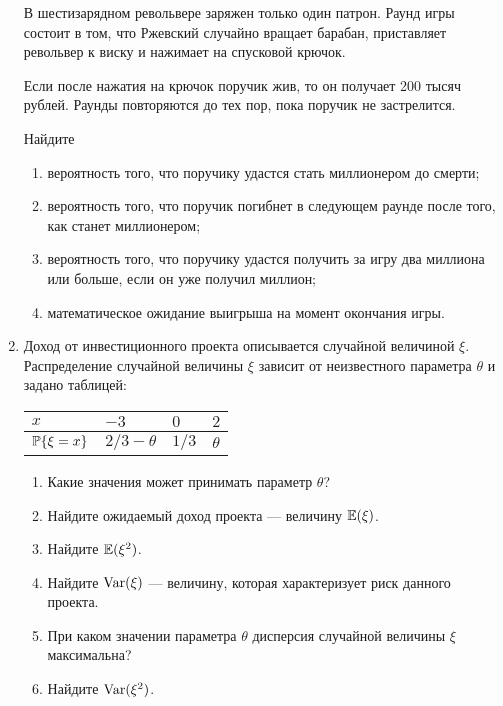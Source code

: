 \begin{enumerate}
  В шестизарядном револьвере заряжен только один патрон. Раунд игры состоит в том, что Ржевский случайно вращает барабан, приставляет револьвер к виску и нажимает на спусковой крючок. 
  
  Если после нажатия на крючок поручик жив, то он получает 200 тысяч рублей. Раунды повторяются до тех пор, пока поручик не застрелится.
  
  Найдите
  
  \begin{enumerate}
      \item вероятность того, что поручику удастся стать миллионером до смерти;
      \item вероятность того, что поручик погибнет в следующем раунде после того, как станет миллионером;
      \item вероятность того, что поручику удастся получить за игру два миллиона или больше, если он уже получил миллион;
      \item математическое ожидание выигрыша на момент окончания игры.
  \end{enumerate}
  
  \item Доход от инвестиционного проекта описывается случайной величиной $\xi$. Распределение случайной величины $\xi$ зависит от неизвестного параметра $\theta$ и задано таблицей:
  
  \begin{center}
  \begin{tabular}{llll}
  \toprule
    $x$              & $-3$                     & $0$              & $2$       \\
  \midrule
    $\P\{\xi = x\}$  &  $2/3 - \theta$          & $1/3$            & $\theta$  \\
  \bottomrule
  \end{tabular}
  \end{center}
  
  \begin{enumerate}
      \item Какие значения может принимать параметр $\theta$?
      \item Найдите ожидаемый доход проекта — величину $\E(\xi)$.
      \item Найдите $\E(\xi^2)$.
      \item Найдите $\Var(\xi)$ — величину, которая характеризует риск данного проекта.
      \item При каком значении параметра $\theta$ дисперсия случайной величины $\xi$ максимальна?
      \item Найдите $\Var(\xi^2)$.
  \end{enumerate}
  

\end{enumerate}
